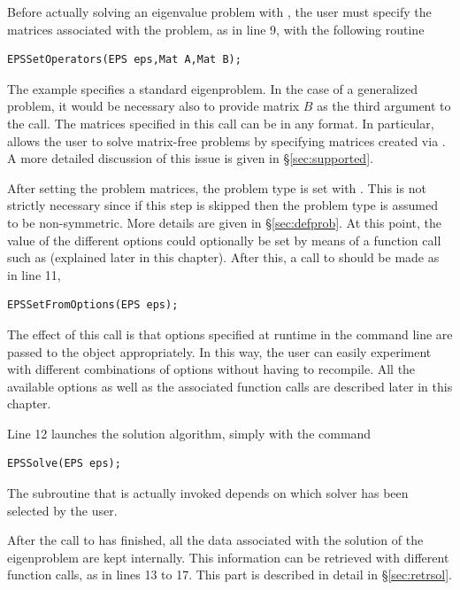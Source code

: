 	Before actually solving an eigenvalue problem with , the user must specify the matrices associated with the problem, as in line 9, with the following routine
	\begin{Verbatim}[fontsize=\small]
	EPSSetOperators(EPS eps,Mat A,Mat B);
	\end{Verbatim}
	The example specifies a standard eigenproblem. In the case of a generalized problem, it would be necessary also to provide matrix $B$ as the third argument to the call. The matrices specified in this call can be in any \petsc format. In particular,  allows the user to solve matrix-free problems by specifying matrices created via . A more detailed discussion of this issue is given in \S\ref{sec:supported}.

	After setting the problem matrices, the problem type is set with . This is not strictly necessary since if this step is skipped then the problem type is assumed to be non-symmetric. More details are given in \S\ref{sec:defprob}.
	At this point, the value of the different options could optionally be set by means of a function call such as  (explained later in this chapter). After this, a call to  should be made as in line 11,
	\begin{Verbatim}[fontsize=\small]
	EPSSetFromOptions(EPS eps);
	\end{Verbatim}
	The effect of this call is that options specified at runtime in the command line are passed to the  object appropriately. In this way, the user can easily experiment with different combinations of options without having to recompile. All the available options as well as the associated function calls are described later in this chapter.

	Line 12 launches the solution algorithm, simply with the command
	\begin{Verbatim}[fontsize=\small]
	EPSSolve(EPS eps);
	\end{Verbatim}
	The subroutine that is actually invoked depends on which solver has been selected by the user.

        After the call to  has finished, all the data associated with the solution of the eigenproblem are kept internally. This information can be retrieved with different function calls, as in lines 13 to 17. This part is described in detail in \S\ref{sec:retrsol}.

